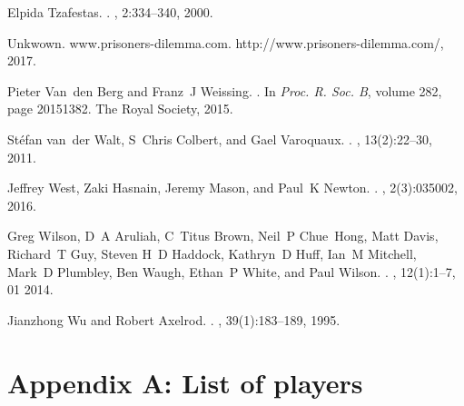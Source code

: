 \documentclass[10pt,letterpaper]{article}
\begin{document}
\begin{thebibliography}{10}
Elpida Tzafestas.
.
, 2:334--340,
  2000.

Unkwown.
\newblock www.prisoners-dilemma.com.
\newblock http://www.prisoners-dilemma.com/, 2017.

Pieter Van~den Berg and Franz~J Weissing.
.
\newblock In {\em Proc. R. Soc. B}, volume 282, page 20151382. The Royal
  Society, 2015.

St{\'e}fan van~der Walt, S~Chris Colbert, and Gael Varoquaux.
.
, 13(2):22--30, 2011.

Jeffrey West, Zaki Hasnain, Jeremy Mason, and Paul~K Newton.
.
, 2(3):035002, 2016.

Greg Wilson, D~A Aruliah, C~Titus Brown, Neil~P Chue~Hong, Matt Davis,
  Richard~T Guy, Steven H~D Haddock, Kathryn~D Huff, Ian~M Mitchell, Mark~D
  Plumbley, Ben Waugh, Ethan~P White, and Paul Wilson.
.
, 12(1):1--7, 01 2014.

Jianzhong Wu and Robert Axelrod.
.
, 39(1):183--189, 1995.

\end{thebibliography}

\appendix

\section{Appendix A: List of players}\label{app:list_of_players}
\end{document}
